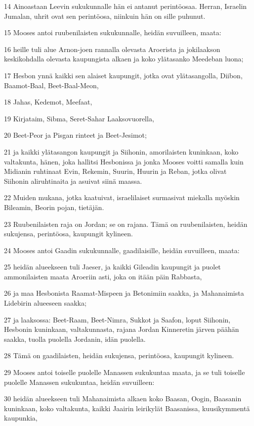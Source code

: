 \par 14 Ainoastaan Leevin sukukunnalle hän ei antanut perintöosaa. Herran, Israelin Jumalan, uhrit ovat sen perintöosa, niinkuin hän on sille puhunut.
\par 15 Mooses antoi ruubenilaisten sukukunnalle, heidän suvuilleen, maata:
\par 16 heille tuli alue Arnon-joen rannalla olevasta Aroerista ja jokilaakson keskikohdalla olevasta kaupungista alkaen ja koko ylätasanko Meedeban luona;
\par 17 Hesbon ynnä kaikki sen alaiset kaupungit, jotka ovat ylätasangolla, Diibon, Baamot-Baal, Beet-Baal-Meon,
\par 18 Jahas, Kedemot, Meefaat,
\par 19 Kirjataim, Sibma, Seret-Sahar Laaksovuorella,
\par 20 Beet-Peor ja Pisgan rinteet ja Beet-Jesimot;
\par 21 ja kaikki ylätasangon kaupungit ja Siihonin, amorilaisten kuninkaan, koko valtakunta, hänen, joka hallitsi Hesbonissa ja jonka Mooses voitti samalla kuin Midianin ruhtinaat Evin, Rekemin, Suurin, Huurin ja Reban, jotka olivat Siihonin aliruhtinaita ja asuivat siinä maassa.
\par 22 Muiden mukana, jotka kaatuivat, israelilaiset surmasivat miekalla myöskin Bileamin, Beorin pojan, tietäjän.
\par 23 Ruubenilaisten raja on Jordan; se on rajana. Tämä on ruubenilaisten, heidän sukujensa, perintöosa, kaupungit kylineen.
\par 24 Mooses antoi Gaadin sukukunnalle, gaadilaisille, heidän suvuilleen, maata:
\par 25 heidän alueekseen tuli Jaeser, ja kaikki Gileadin kaupungit ja puolet ammonilaisten maata Aroeriin asti, joka on itään päin Rabbasta,
\par 26 ja maa Hesbonista Raamat-Mispeen ja Betonimiin saakka, ja Mahanaimista Lidebirin alueeseen saakka;
\par 27 ja laaksossa: Beet-Raam, Beet-Nimra, Sukkot ja Saafon, loput Siihonin, Hesbonin kuninkaan, valtakunnasta, rajana Jordan Kinneretin järven päähän saakka, tuolla puolella Jordanin, idän puolella.
\par 28 Tämä on gaadilaisten, heidän sukujensa, perintöosa, kaupungit kylineen.
\par 29 Mooses antoi toiselle puolelle Manassen sukukuntaa maata, ja se tuli toiselle puolelle Manassen sukukuntaa, heidän suvuilleen:
\par 30 heidän alueekseen tuli Mahanaimista alkaen koko Baasan, Oogin, Baasanin kuninkaan, koko valtakunta, kaikki Jaairin leirikylät Baasanissa, kuusikymmentä kaupunkia,
